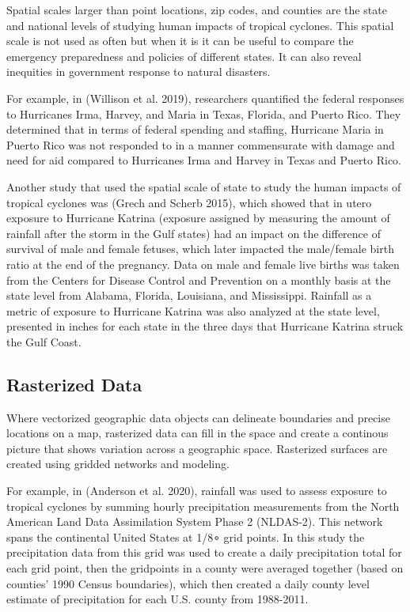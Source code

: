 \documentclass[
]{article}
\begin{document}
Spatial scales larger than point locations, zip codes, and counties are
the state and national levels of studying human impacts of tropical
cyclones. This spatial scale is not used as often but when it is it can
be useful to compare the emergency preparedness and policies of
different states. It can also reveal inequities in government response
to natural disasters.

For example, in (Willison et al. 2019), researchers quantified the
federal responses to Hurricanes Irma, Harvey, and Maria in Texas,
Florida, and Puerto Rico. They determined that in terms of federal
spending and staffing, Hurricane Maria in Puerto Rico was not responded
to in a manner commensurate with damage and need for aid compared to
Hurricanes Irma and Harvey in Texas and Puerto Rico.

Another study that used the spatial scale of state to study the human
impacts of tropical cyclones was (Grech and Scherb 2015), which showed
that in utero exposure to Hurricane Katrina (exposure assigned by
measuring the amount of rainfall after the storm in the Gulf states) had
an impact on the difference of survival of male and female fetuses,
which later impacted the male/female birth ratio at the end of the
pregnancy. Data on male and female live births was taken from the
Centers for Disease Control and Prevention on a monthly basis at the
state level from Alabama, Florida, Louisiana, and Mississippi. Rainfall
as a metric of exposure to Hurricane Katrina was also analyzed at the
state level, presented in inches for each state in the three days that
Hurricane Katrina struck the Gulf Coast.

\hypertarget{rasterized-data}{%
\subsection{Rasterized Data}\label{rasterized-data}}

Where vectorized geographic data objects can delineate boundaries and
precise locations on a map, rasterized data can fill in the space and
create a continous picture that shows variation across a geographic
space. Rasterized surfaces are created using gridded networks and
modeling.

For example, in (Anderson et al. 2020), rainfall was used to assess
exposure to tropical cyclones by summing hourly precipitation
measurements from the North American Land Data Assimilation System Phase
2 (NLDAS-2). This network spans the continental United States at 1/8∘
grid points. In this study the precipitation data from this grid was
used to create a daily precipitation total for each grid point, then the
gridpoints in a county were averaged together (based on counties' 1990
Census boundaries), which then created a daily county level estimate of
precipitation for each U.S. county from 1988-2011.
\end{document}
